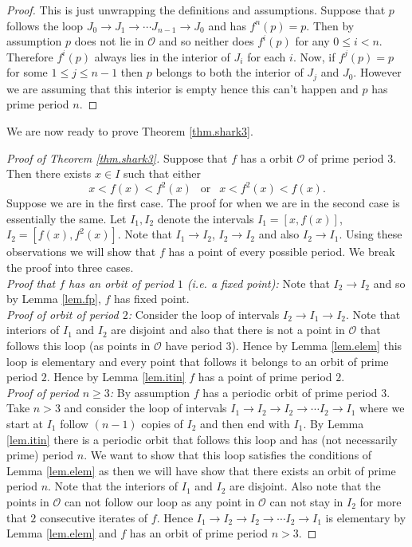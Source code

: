 \documentclass[12pt]{article}
\theoremstyle{definition}
\theoremstyle{remark}
\begin{document}
\begin{proof}
This is just unwrapping the definitions and assumptions. Suppose that $p$ follows the loop $J_0 \to J_1 \to \cdots J_{n-1} \to J_0$ and has $f^n(p) = p$. Then by assumption $p$ does not lie in $\mathcal{O}$ and so neither does $f^i(p)$ for any $0 \le i < n$. Therefore $f^i(p)$ always lies in the interior of $J_i$ for each $i$. Now, if $f^j(p) = p$ for some $1 \le j \le n-1$ then $p$ belongs to both the interior of $J_j$ and $J_0$. However we are assuming that this interior is empty hence this can't happen and $p$ has prime period $n$.
\end{proof}

We are now ready to prove Theorem \ref{thm.shark3}.

\begin{proof}[Proof of Theorem \ref{thm.shark3}]
Suppose that $f$ has a orbit $\mathcal{O}$ of prime period $3$. Then there exists $x \in I$ such that either
\[
x < f(x) < f^2(x) \ \ \text{ or } \ \ x < f^2(x) < f(x).
\]
Suppose we are in the first case. The proof for when we are in the second case is essentially the same. Let $I_1, I_2$ denote the intervals $I_1 = [x, f(x)]$, $I_2 = [f(x), f^2(x)]$. Note that $I_1 \to I_2$,  $I_2 \to I_2$ and also $I_2 \to I_1$. Using these observations we will show that $f$ has a point of every possible period. We break the proof into three cases.\\
\noindent \textit{Proof that $f$ has an orbit of period $1$ (i.e. a fixed point):} Note that $I_2 \to I_2$ and so by Lemma \ref{lem.fp}, $f$ has fixed point.\\
\noindent \textit{Proof of orbit of period $2$:} Consider the loop of intervals $I_2 \to I_1 \to I_2$. Note that interiors of $I_1$ and $I_2$ are disjoint and also that there is not a point in $\mathcal{O}$ that follows this loop (as points in $\mathcal{O}$ have period $3$). Hence by Lemma \ref{lem.elem} this loop is elementary and every point that follows it belongs to an orbit of prime period $2$. Hence by Lemma  \ref{lem.itin} $f$ has a point of prime period $2$.\\
\noindent \textit{Proof of period $n\ge 3$:} By assumption $f$ has a periodic orbit of prime period $3$. Take $n > 3$ and consider the loop of intervals $I_1 \to I_2 \to I_2 \to \cdots I_2 \to I_1$ where we start at $I_1$ follow $(n-1)$ copies of $I_2$ and then end with $I_1$. By Lemma \ref{lem.itin} there is a periodic orbit that follows this loop and has (not necessarily prime) period $n$. We want to show that this loop satisfies the conditions of Lemma \ref{lem.elem} as then we will have show that there exists an orbit of prime period $n$. Note that the interiors of $I_1$ and $I_2$ are disjoint. Also note that the points in $\mathcal{O}$ can not follow our loop as any point in $\mathcal{O}$ can not stay in $I_2$ for more that $2$ consecutive iterates of $f$. Hence $I_1 \to I_2 \to I_2 \to \cdots I_2 \to I_1$  is elementary by Lemma \ref{lem.elem} and $f$ has an orbit of prime period $n >3$.
\end{proof}
\end{document}
